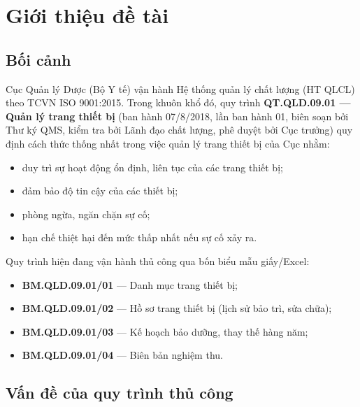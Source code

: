 \chapter{Giới thiệu đề tài}

\section{Bối cảnh}

Cục Quản lý Dược (Bộ Y tế) vận hành Hệ thống quản lý chất lượng (HT QLCL) theo TCVN ISO 9001:2015. Trong khuôn khổ đó, quy trình \textbf{QT.QLD.09.01 --- Quản lý trang thiết bị} (ban hành 07/8/2018, lần ban hành 01, biên soạn bởi Thư ký QMS, kiểm tra bởi Lãnh đạo chất lượng, phê duyệt bởi Cục trưởng) quy định cách thức thống nhất trong việc quản lý trang thiết bị của Cục nhằm:
\begin{itemize}
  \item duy trì sự hoạt động ổn định, liên tục của các trang thiết bị;
  \item đảm bảo độ tin cậy của các thiết bị;
  \item phòng ngừa, ngăn chặn sự cố;
  \item hạn chế thiệt hại đến mức thấp nhất nếu sự cố xảy ra.
\end{itemize}

Quy trình hiện đang vận hành thủ công qua bốn biểu mẫu giấy/Excel:
\begin{itemize}
  \item \textbf{BM.QLD.09.01/01} --- Danh mục trang thiết bị;
  \item \textbf{BM.QLD.09.01/02} --- Hồ sơ trang thiết bị (lịch sử bảo trì, sửa chữa);
  \item \textbf{BM.QLD.09.01/03} --- Kế hoạch bảo dưỡng, thay thế hàng năm;
  \item \textbf{BM.QLD.09.01/04} --- Biên bản nghiệm thu.
\end{itemize}

\section{Vấn đề của quy trình thủ công}

